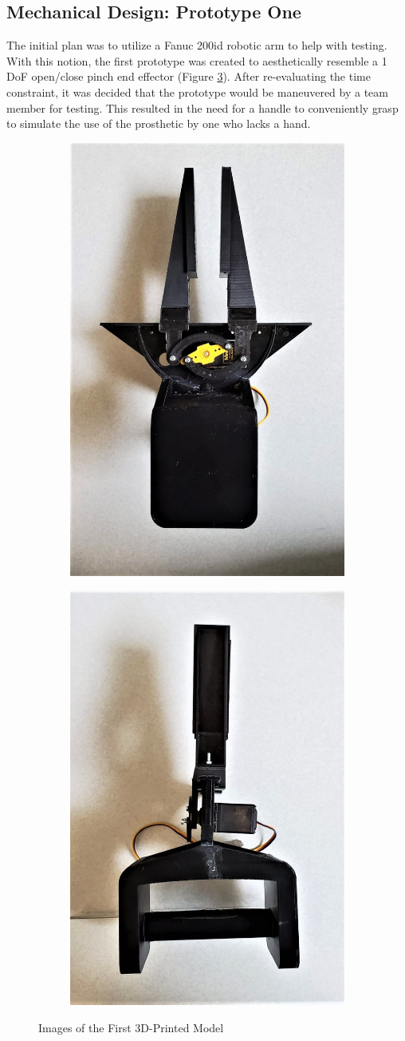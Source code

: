 \documentclass[11.5pt]{article}
\begin{document}
\newpage
\subsection{Mechanical Design: Prototype One}

The initial plan was to utilize a Fanuc 200id robotic arm to help with testing. With this notion, the first prototype was created to aesthetically resemble a 1 DoF open/close pinch end effector (Figure \ref{fig:hh}). After re-evaluating the time constraint, it was decided that the prototype would be maneuvered by a team member for testing. This resulted in the need for a handle to conveniently grasp to simulate the use of the prosthetic by one who lacks a hand.\\

\begin{figure}[H]
\centering
\begin{subfigure}
  \centering
  \includegraphics[width=0.25\columnwidth]{2d/WhatsApp Image 2020-02-14 at 2.43.31 PM.jpeg}
  \label{fig:sub1}
\end{subfigure}%
\begin{subfigure}
  \centering
  \includegraphics[width=0.263\columnwidth]{2d/WhatsApp Image 2020-02-14 at 2.51.39 PM.jpeg}
  \label{fig:sub2}
\end{subfigure}
\caption{Images of the First 3D-Printed Model}
\label{fig:hh}
\end{figure}
\end{document}
